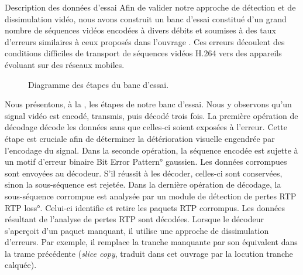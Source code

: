 \begin{section}{Description des données d'essai}
\label{sec-bancEssai}
Afin de valider notre approche de détection et de dissimulation vidéo,
nous avons construit un banc d'essai constitué d'un grand nombre de séquences
vidéos encodées à divers débits et soumises à des taux d'erreurs similaires à
ceux proposés dans l'ouvrage \citep{Stockhammer2003}. Ces erreurs découlent des
conditions difficiles de transport de séquences vidéos H.264 vers des appareils
évoluant sur des réseaux mobiles.

\begin{figure}
	\caption[Diagramme des étapes du banc d'essai]{Diagramme des étapes du banc
d'essai.}
	\label{fig-EncoderDecoder}
\end{figure}

Nous présentons, à la , les étapes de
notre banc d'essai. Nous y observons qu'un signal vidéo est encodé, transmis,
puis décodé trois fois. La première opération de décodage décode les données
sans que celles-ci soient exposées à l’erreur. Cette étape est cruciale afin de
déterminer la détérioration visuelle engendrée par l’encodage du signal. Dans la
seconde opération, la séquence encodée est sujette à un motif d’erreur binaire
\ang{Bit Error Pattern} gaussien. Les données corrompues sont envoyées au
décodeur. S’il réussit à les décoder, celles-ci sont conservées, sinon la
sous-séquence est rejetée. Dans la dernière opération de décodage, la
sous-séquence corrompue est analysée par un module de détection de pertes RTP
\ang{RTP loss}. Celui-ci identifie et retire les paquets RTP corrompus. Les
données résultant de l’analyse de pertes RTP sont décodées. Lorsque le décodeur
s'aperçoit d'un paquet manquant, il utilise une approche de dissimulation
d’erreurs. Par exemple, il remplace la tranche manquante par son équivalent dans
la trame précédente (\textit{slice copy},
traduit dans cet ouvrage par la locution tranche calquée).


\end{section}
